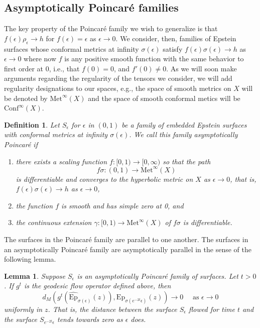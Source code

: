 \documentclass{amsart}
\newtheorem{lem}[thm]{Lemma}
\newtheorem{defn}{Definition}
\begin{document}
\subsection{Asymptotically Poincar\'e families}
\label{asym-def-section}


The key property of the Poincar\'e family we wish to generalize is that $f(\epsilon)\rho_\epsilon \to h$ for $f(\epsilon) = \epsilon$ as $\epsilon \to 0$. 
We consider, then, families of Epstein surfaces whose conformal metrics at infinity $\sigma(\epsilon)$ satisfy $f(\epsilon)\sigma(\epsilon) \to h$ as $\epsilon \to 0$ where now $f$ is any positive smooth function with the same behavior to first order at $0$, i.e., that $f(0) = 0$, and $f'(0) \neq 0$. 
As we will soon make arguments regarding the regularity of the tensors we consider, we will add regularity designations to our spaces, e.g., the space of smooth metrics on $X$ will be denoted by $\mathrm{Met}^\infty(X)$ and the space of smooth conformal metics will be $\mathrm{Conf}^\infty(X)$.



\begin{defn}
\label{asym-def}
Let $S_\epsilon$ for $\epsilon$ in $(0,1)$ be a family of embedded Epstein surfaces with conformal metrics at infinity $\sigma(\epsilon)$. 
We call this family \textit{asymptotically Poincar\'e} if 
\begin{enumerate}
    \item there exists a scaling function $f:[0,1) \to [0,\infty)$ so that the path 
    \[
f\sigma:(0,1) \to \mathrm{Met}^\infty(X)
\]
is differentiable and converges to the hyperbolic metric on $X$ as $\epsilon \to 0$, that is, $f(\epsilon)\sigma(\epsilon) \to h$ as $\epsilon \to 0$,
    \item the function $f$ is smooth and has simple zero at 0, and
    \item the continuous extension $\gamma:[0,1) \to \mathrm{Met}^\infty(X)$ of $f \sigma$ is differentiable.
\end{enumerate}

\end{defn}


The surfaces in the Poincar\'e family are parallel to one another. The surfaces in an asymptotically Poincar\'e family are asymptotically parallel in the sense of the following lemma. 
 




\begin{lem}\label{asym-parallel-lemma}
Suppose $S_\epsilon$ is an asymptotically Poincar\'e family of surfaces. 
Let $t > 0$. 
If $g^t$ is the geodesic flow operator defined above, then  
\[
d_M \left(g^t (\widehat{\mathrm{Ep}}_{\sigma(\epsilon)}(z)), \mathrm{Ep}_{\sigma(e^{-2t} \epsilon)}(z) \right) \to 0
\quad \text{ as } \epsilon \to 0
\]
uniformly in $z$. 
That is, the distance between the surface $S_\epsilon$ flowed for time $t$ and the surface $S_{e^{-2t}\epsilon}$ tends towards zero as $\epsilon$ does. 
\end{lem}
\end{document}
